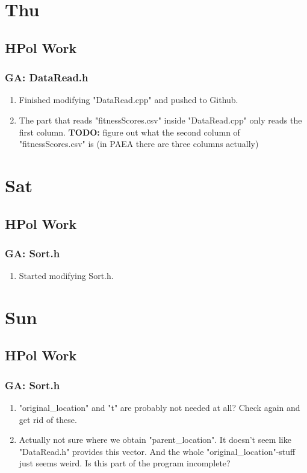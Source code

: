 \documentclass[12pt,letterpaper]{article}
\begin{document}
\newpage
\setcounter{section}{5}

\section{Thu}
\subsection{HPol Work}
\subsubsection{GA: DataRead.h}
\begin{enumerate}
  \item Finished modifying "DataRead.cpp" and pushed to Github.
  \item The part that reads "fitnessScores.csv" inside "DataRead.cpp" only reads the 
    first column. \textbf{TODO:} figure out what the second column of "fitnessScores.csv"
    is (in PAEA there are three columns actually)
\end{enumerate}

\newpage
\setcounter{section}{7}

\section{Sat}
\subsection{HPol Work}
\subsubsection{GA: Sort.h}
\begin{enumerate}
  \item Started modifying Sort.h.
\end{enumerate}

\section{Sun}
\subsection{HPol Work}
\subsubsection{GA: Sort.h}
\begin{enumerate}
  \item "original_location" and "t" are probably not needed at all? Check again and
    get rid of these.
  \item Actually not sure where we obtain "parent_location". It doesn't seem like
    "DataRead.h" provides this vector. And the whole "original_location"-stuff just 
    seems weird. Is this part of the program incomplete?
\end{enumerate}
\end{document}
